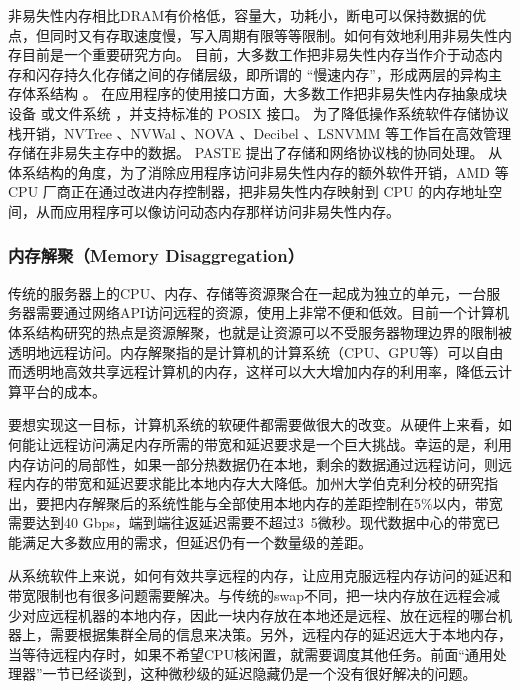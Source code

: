 非易失性内存相比DRAM有价格低，容量大，功耗小，断电可以保持数据的优点，但同时又有存取速度慢，写入周期有限等等限制。如何有效地利用非易失性内存目前是一个重要研究方向。
目前，大多数工作把非易失性内存当作介于动态内存和闪存持久化存储之间的存储层级，即所谓的 ``慢速内存''，形成两层的异构主存体系结构 \cite{dulloor2016data,agarwal2017thermostat}。
在应用程序的使用接口方面，大多数工作把非易失性内存抽象成块设备 \cite{bailey2011operating,huang2014nvram,kim2016nvwal,mogul2009operating,nanavati2017decibel,hu2017log} 或文件系统 \cite{condit2009better,yang2015nv,xu2016nova}，并支持标准的 POSIX 接口。
为了降低操作系统软件存储协议栈开销，NVTree \cite{yang2015nv}、NVWal \cite{kim2016nvwal}、NOVA \cite{xu2016nova}、Decibel \cite{nanavati2017decibel}、LSNVMM \cite{hu2017log} 等工作旨在高效管理存储在非易失主存中的数据。
PASTE \cite{honda2018paste} 提出了存储和网络协议栈的协同处理。
从体系结构的角度，为了消除应用程序访问非易失性内存的额外软件开销，AMD 等 CPU 厂商正在通过改进内存控制器，把非易失性内存映射到 CPU 的内存地址空间，从而应用程序可以像访问动态内存那样访问非易失性内存。


\subsubsection{内存解聚（Memory Disaggregation）}

传统的服务器上的CPU、内存、存储等资源聚合在一起成为独立的单元，一台服务器需要通过网络API访问远程的资源，使用上非常不便和低效。目前一个计算机体系结构研究的热点是资源解聚，也就是让资源可以不受服务器物理边界的限制被透明地远程访问。内存解聚指的是计算机的计算系统（CPU、GPU等）可以自由而透明地高效共享远程计算机的内存，这样可以大大增加内存的利用率，降低云计算平台的成本。

要想实现这一目标，计算机系统的软硬件都需要做很大的改变。从硬件上来看，如何能让远程访问满足内存所需的带宽和延迟要求是一个巨大挑战。幸运的是，利用内存访问的局部性，如果一部分热数据仍在本地，剩余的数据通过远程访问，则远程内存的带宽和延迟要求能比本地内存大大降低。加州大学伯克利分校的研究指出，要把内存解聚后的系统性能与全部使用本地内存的差距控制在5\%以内，带宽需要达到40 Gbps，端到端往返延迟需要不超过3~5微秒。现代数据中心的带宽已能满足大多数应用的需求，但延迟仍有一个数量级的差距。

从系统软件上来说，如何有效共享远程的内存，让应用克服远程内存访问的延迟和带宽限制也有很多问题需要解决。与传统的swap不同，把一块内存放在远程会减少对应远程机器的本地内存，因此一块内存放在本地还是远程、放在远程的哪台机器上，需要根据集群全局的信息来决策。另外，远程内存的延迟远大于本地内存，当等待远程内存时，如果不希望CPU核闲置，就需要调度其他任务。前面“通用处理器”一节已经谈到，这种微秒级的延迟隐藏仍是一个没有很好解决的问题。

